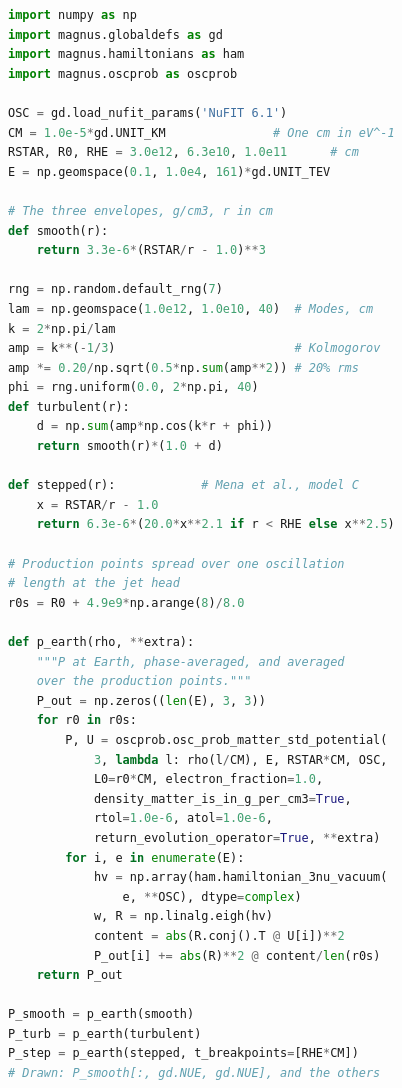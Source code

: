 \documentclass[final,5p,times,twocolumn,sort,compress]{elsarticle}
\makeatletter
\newcommand{\eq}{Eq.}
\newcommand{\fig}{Fig.}
\DeclareRobustCommand{\_}{%
  \ifmmode\nfss@text{\textunderscore}\else\textunderscore\allowbreak\fi}
\providecommand{\Ref}{}
\newcommand{\equ}[1]{\eq~(\ref{equ:#1})}
\newcommand{\figu}[1]{\fig~\ref{fig:#1}}
\makeatother
\begin{document}
\begin{lstlisting}[language=Python, caption={\textbf{Jet neutrinos in a stellar envelope.} Computing the data in \figu{jet}: the averaged $\nu_e$ survival probability at Earth for neutrinos from a jet head at $r_0$, through the three envelopes. Each call returns the evolution operator from the refinement ladder alongside the probabilities; the projection onto the vacuum mass states and the sum over them are \equ{averaged_varying}, with the eigenbasis at detection the vacuum one. The eight production points span one oscillation length at the jet head, $4.9 \cdot 10^{9}$~cm. The turbulent envelope is one realization of forty Kolmogorov modes between $10^{10}$ and $10^{12}$~cm at 20\% rms; the stepped one is model C of \Ref\ \cite{Mena:2006eq}, with the drop at the helium-core edge declared through {\tt t\_breakpoints}. See notebook \#28 and Sec.~\ref{sec:jet} for details.}, label={lst:jet}, float=t]
import numpy as np
import magnus.globaldefs as gd
import magnus.hamiltonians as ham
import magnus.oscprob as oscprob

OSC = gd.load_nufit_params('NuFIT 6.1')
CM = 1.0e-5*gd.UNIT_KM               # One cm in eV^-1
RSTAR, R0, RHE = 3.0e12, 6.3e10, 1.0e11      # cm
E = np.geomspace(0.1, 1.0e4, 161)*gd.UNIT_TEV

# The three envelopes, g/cm3, r in cm
def smooth(r):
    return 3.3e-6*(RSTAR/r - 1.0)**3

rng = np.random.default_rng(7)        
lam = np.geomspace(1.0e12, 1.0e10, 40)  # Modes, cm
k = 2*np.pi/lam
amp = k**(-1/3)                         # Kolmogorov
amp *= 0.20/np.sqrt(0.5*np.sum(amp**2)) # 20% rms
phi = rng.uniform(0.0, 2*np.pi, 40)
def turbulent(r):
    d = np.sum(amp*np.cos(k*r + phi))
    return smooth(r)*(1.0 + d)

def stepped(r):            # Mena et al., model C
    x = RSTAR/r - 1.0
    return 6.3e-6*(20.0*x**2.1 if r < RHE else x**2.5)

# Production points spread over one oscillation
# length at the jet head
r0s = R0 + 4.9e9*np.arange(8)/8.0

def p_earth(rho, **extra):
    """P at Earth, phase-averaged, and averaged
    over the production points."""
    P_out = np.zeros((len(E), 3, 3))
    for r0 in r0s:
        P, U = oscprob.osc_prob_matter_std_potential(
            3, lambda l: rho(l/CM), E, RSTAR*CM, OSC,
            L0=r0*CM, electron_fraction=1.0,
            density_matter_is_in_g_per_cm3=True,
            rtol=1.0e-6, atol=1.0e-6,
            return_evolution_operator=True, **extra)
        for i, e in enumerate(E):
            hv = np.array(ham.hamiltonian_3nu_vacuum(
                e, **OSC), dtype=complex)
            w, R = np.linalg.eigh(hv)
            content = abs(R.conj().T @ U[i])**2
            P_out[i] += abs(R)**2 @ content/len(r0s)
    return P_out

P_smooth = p_earth(smooth)
P_turb = p_earth(turbulent)
P_step = p_earth(stepped, t_breakpoints=[RHE*CM])
# Drawn: P_smooth[:, gd.NUE, gd.NUE], and the others
\end{lstlisting}
\end{document}
